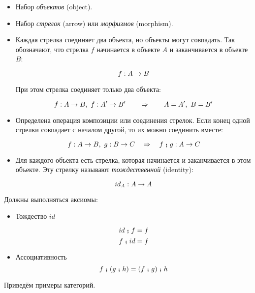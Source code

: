\begin{itemize}
\item Набор \emph{объектов} (object).
\item Набор \emph{стрелок} (arrow) или \emph{морфизмов} (morphism).
\item Каждая стрелка соединяет два объекта, но объекты могут совпадать. 
    Так обозначают, что стрелка $f$ начинается в объекте $A$ и заканчивается 
    в \mbox{объекте $B$}:

    \[ f : A \rightarrow B \]

    При этом стрелка соединяет только два объекта:

    \[ f : A \rightarrow B,\ f : A' \rightarrow B' \qquad \Rightarrow \qquad A=A',\ B=B' \]

\item Определена операция композиции или соединения стрелок. 
    Если конец одной стрелки совпадает с началом другой,
    то их можно соединить вместе:

    \[ f:A \rightarrow B,\ g : B\rightarrow C \quad \Rightarrow \quad f \footnotesize\textbf{~;~}\normalsize g : A \rightarrow C \]

\item Для каждого объекта есть стрелка, которая начинается
    и заканчивается в этом объекте. Эту стрелку называют
    \emph{тождественной} (identity):

    \[ id_A : A \rightarrow A \]

\end{itemize}

Должны выполняться аксиомы:


\begin{itemize}
        
\item Тождество $id$

    \[ id \footnotesize\textbf{~;~}\normalsize f = f \]
    \[ f \footnotesize\textbf{~;~}\normalsize id = f \]

\item Ассоциативность \Co
    \[ f \footnotesize\textbf{~;~}\normalsize (g \footnotesize\textbf{~;~}\normalsize h) = (f \footnotesize\textbf{~;~}\normalsize g) \footnotesize\textbf{~;~}\normalsize h \]
\end{itemize}

Приведём примеры категорий. 

